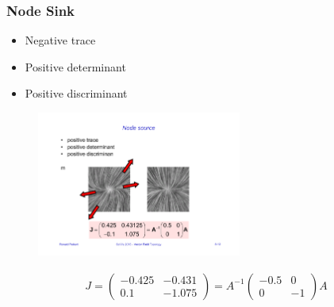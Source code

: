 \subsubsection{Node Sink}
\begin{itemize}
    \item Negative trace
    \item Positive determinant
    \item Positive discriminant
\end{itemize}
\begin{figure}[H]
    \centering
    \includegraphics[width=0.6\textwidth,page=2]{img/08_2d_critical_points}
\end{figure}
\begin{align*}
J = \begin{pmatrix}
     -0.425 & -0.431\\
     0.1 & -1.075
 \end{pmatrix}
 = A ^{-1} 
     \begin{pmatrix}
         -0.5 & 0\\
         0 & -1
     \end{pmatrix}A
\end{align*}

